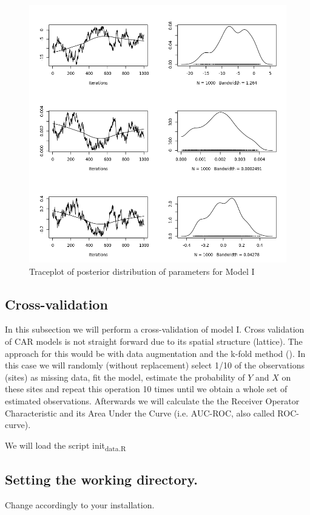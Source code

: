 \documentclass[11pt]{article}
\begin{document}
\begin{figure}[htbp]
\centering
\includegraphics[width=.9\linewidth]{./traceplot.png}
\caption{Traceplot of posterior distribution of parameters for Model I}
\end{figure}



\subsection{Cross-validation}
\label{sec:org86a5da8}
In this subsection we will perform a cross-validation of model I. Cross validation of CAR models is not straight forward due to its spatial structure (lattice). The approach for this would be with data augmentation and the k-fold method (\cite{Geisser1975}). In this case we will randomly (without replacement) select 1/10 of the observations (sites) as missing data, fit the model, estimate the probability of \(Y\) and \(X\) on these sites and repeat this operation 10 times until we obtain a whole set of estimated observations. Afterwards we will calculate the the Receiver Operator Characteristic and its Area Under the Curve (i.e. AUC-ROC, also called ROC-curve).

We will load the script init\textsubscript{data.R}

\subsection{Setting the working directory.}
\label{sec:org9dc427d}
Change accordingly to your installation.
\end{document}
